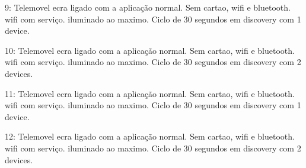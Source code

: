 9: Telemovel ecra ligado com a aplicação normal. Sem cartao, wifi e bluetooth. wifi com serviço. iluminado ao maximo. Ciclo de 30 segundos em discovery com 1 device.

10: Telemovel ecra ligado com a aplicação normal. Sem cartao, wifi e bluetooth. wifi com serviço. iluminado ao maximo. Ciclo de 30 segundos em discovery com 2 devices.

11: Telemovel ecra ligado com a aplicação normal. Sem cartao, wifi e bluetooth. wifi com serviço. iluminado ao maximo. Ciclo de 30 segundos em discovery com 1 device.

12: Telemovel ecra ligado com a aplicação normal. Sem cartao, wifi e bluetooth. wifi com serviço. iluminado ao maximo. Ciclo de 30 segundos em discovery com 2 devices.